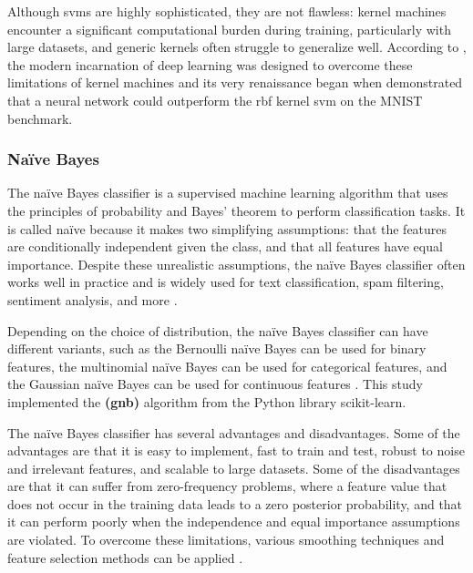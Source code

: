 Although \gls{svm}s are highly sophisticated, they are not flawless: kernel machines encounter a significant computational burden during training, particularly with large datasets, and generic kernels often struggle to generalize well. According to \textcite{Goodfellow2016}, the modern incarnation of deep learning was designed to overcome these limitations of kernel machines and its very renaissance began when \textcite{Hinton2006} demonstrated that a neural network could outperform the \gls{rbf} kernel \gls{svm} on the MNIST benchmark.


\subsubsection{Naïve Bayes}
\label{subsubsec:machine_learning_GNB}

The naïve Bayes classifier is a supervised machine learning algorithm that uses the principles of probability and Bayes' theorem to perform classification tasks. It is called naïve because it makes two simplifying assumptions: that the features are conditionally independent given the class, and that all features have equal importance. Despite these unrealistic assumptions, the naïve Bayes classifier often works well in practice and is widely used for text classification, spam filtering, sentiment analysis, and more \cite{Barber2012}.

Depending on the choice of distribution, the naïve Bayes classifier can have different variants, such as the Bernoulli naïve Bayes can be used for binary features, the multinomial naïve Bayes can be used for categorical features, and the Gaussian naïve Bayes can be used for continuous features \cite{Friedman1997}. This study implemented the \textbf{ (\gls{gnb})} algorithm from the Python library scikit-learn.

The naïve Bayes classifier has several advantages and disadvantages. Some of the advantages are that it is easy to implement, fast to train and test, robust to noise and irrelevant features, and scalable to large datasets. Some of the disadvantages are that it can suffer from zero-frequency problems, where a feature value that does not occur in the training data leads to a zero posterior probability, and that it can perform poorly when the independence and equal importance assumptions are violated. To overcome these limitations, various smoothing techniques and feature selection methods can be applied \cite{Wickramasinghe2021}.

